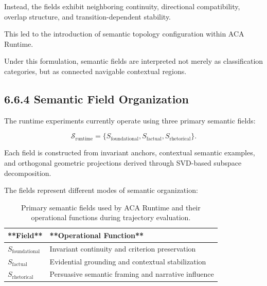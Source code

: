 \documentclass[11pt]{article}
\begin{document}
Instead, the fields exhibit neighboring continuity, directional compatibility, overlap structure, and transition-dependent stability.

This led to the introduction of semantic topology configuration within ACA Runtime.

Under this formulation, semantic fields are interpreted not merely as classification categories, but as connected navigable contextual regions.

\subsection{6.6.4 Semantic Field Organization}

The runtime experiments currently operate using three primary semantic fields:

$$
\mathcal{S}_{\mathrm{runtime}}
=
\{
S_{\mathrm{foundational}},
S_{\mathrm{factual}},
S_{\mathrm{rhetorical}}
\}.
$$

Each field is constructed from invariant anchors, contextual semantic examples, and orthogonal geometric projections derived through SVD-based subspace decomposition.

The fields represent different modes of semantic organization:

\begin{table}[h]

\centering

\begin{tabular}{ll}

\hline

**Field** & **Operational Function** \\

\hline

$S_{\mathrm{foundational}}$ & Invariant continuity and criterion preservation \\

$S_{\mathrm{factual}}$ & Evidential grounding and contextual stabilization \\

$S_{\mathrm{rhetorical}}$ & Persuasive semantic framing and narrative influence \\

\hline

\end{tabular}

\caption{Primary semantic fields used by ACA Runtime and their operational functions during trajectory evaluation.}

\label{tab:semantic-field-functions}

\end{table}
\end{document}
